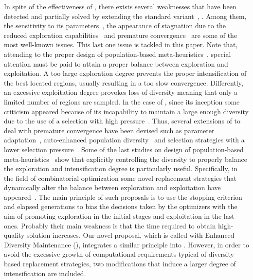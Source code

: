 In spite of the effectiveness of \DE{}, there exists several weaknesses that have been detected and partially
solved by extending the standard variant~\cite{das2011differential}, \cite{locatelli2015non}.
%
Among them, the sensitivity to its parameters~\cite{zhang2009jade}, the appearance of stagnation due to the reduced exploration 
capabilities~\cite{sa2008exploration,lampinen2000stagnation} and premature convergence~\cite{zaharie2003control} are some of the most well-known
issues.
%
This last one issue is tackled in this paper.
%
Note that, attending to the proper design of population-based meta-heuristics~\cite{Talbi:09}, special attention must be
paid to attain a proper balance between exploration and exploitation.
%
A too large exploration degree prevents the proper intensification of the best located regions, usually resulting in a
too slow convergence.
%
Differently, an excessive exploitation degree provokes loss of diversity meaning that only a limited number of regions are sampled.
%
In the case of \DE{}, since its inception some criticism appeared because of its incapability to maintain a large
enough diversity due to the use of a selection with high pressure~\cite{sa2008exploration}.
%
Thus, several extensions of \DE{} to deal with premature convergence have been devised 
such as parameter adaptation~\cite{zaharie2003control}, 
auto-enhanced population diversity~\cite{yang2015differential} and selection strategies 
with a lower selection pressure~\cite{sa2008exploration}.
%
Some of the last studies on design of population-based meta-heuristics~\cite{Crepinsek:13} show that 
explicitly controlling the diversity to properly balance the exploration and intensification degree
is particularly useful.
%
Specifically, in the field of combinatorial optimization some novel replacement strategies that dynamically alter 
the balance between exploration and exploitation 
have appeared~\cite{segura2016novel}.
%
The main principle of such proposals is to use the stopping criterion and elapsed generations to bias the decisions 
taken by the optimizers with the aim of promoting exploration in the initial stages and exploitation in the last ones.
%
Probably their main weakness is that the time required to obtain high-quality solution increases.
%
Our novel proposal, which is called \DE{} with Enhanced Diversity Maintenance (\DEEDM{}), integrates a similar principle into \DE{}.
%
However, in order to avoid the excessive growth of computational requirements typical of diversity-based replacement strategies, 
two modifications that induce a larger degree of intensification are included.

